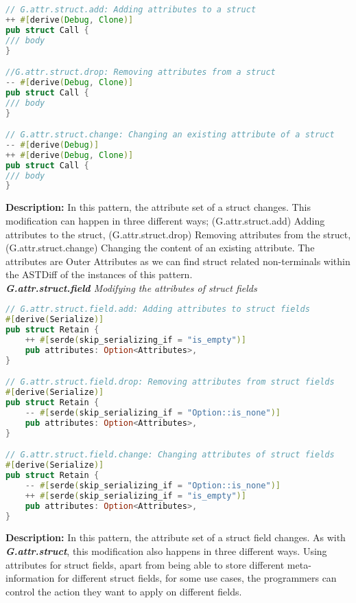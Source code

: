 \begin{lstlisting}[language=Rust, style=colouredRust]
// G.attr.struct.add: Adding attributes to a struct
++ #[derive(Debug, Clone)]
pub struct Call {
/// body 
}

//G.attr.struct.drop: Removing attributes from a struct
-- #[derive(Debug, Clone)]
pub struct Call {
/// body 
}

// G.attr.struct.change: Changing an existing attribute of a struct
-- #[derive(Debug)]
++ #[derive(Debug, Clone)]
pub struct Call {
/// body 
}
\end{lstlisting}

\noindent \textbf{Description:} In this pattern, the attribute set of a struct changes. This modification can happen in three different ways; (G.attr.struct.add) Adding attributes to the struct, (G.attr.struct.drop) Removing attributes from the struct, (G.attr.struct.change) Changing the content of an existing attribute. The attributes are Outer Attributes as we can find struct related non-terminals within the ASTDiff of the instances of this pattern. \\

\noindent \textit{ \textbf{G.attr.struct.field} Modifying the attributes of struct fields}

\begin{lstlisting}[language=Rust, style=colouredRust]
// G.attr.struct.field.add: Adding attributes to struct fields
#[derive(Serialize)]
pub struct Retain {
    ++ #[serde(skip_serializing_if = "is_empty")]
    pub attributes: Option<Attributes>,
}

// G.attr.struct.field.drop: Removing attributes from struct fields
#[derive(Serialize)]
pub struct Retain {
    -- #[serde(skip_serializing_if = "Option::is_none")]
    pub attributes: Option<Attributes>,
}

// G.attr.struct.field.change: Changing attributes of struct fields
#[derive(Serialize)]
pub struct Retain {
    -- #[serde(skip_serializing_if = "Option::is_none")]
    ++ #[serde(skip_serializing_if = "is_empty")]
    pub attributes: Option<Attributes>,
}
\end{lstlisting}

\noindent \textbf{Description:} In this pattern, the attribute set of a struct field changes. As with \textit{\textbf{G.attr.struct}}, this modification also happens in three different ways. Using attributes for struct fields, apart from being able to store different meta-information for different struct fields, for some use cases, the programmers can control the action they want to apply on different fields.

